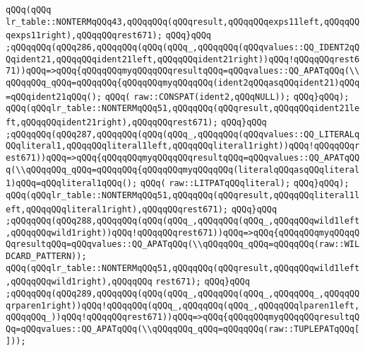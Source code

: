 \verb|qQQq(qQQq|\newline
\verb|lr_table::NONTERMqQQq43,qQQqqQQq(qQQqresult,qQQqqQQqexps11left,qQQqqQQqexps11right),qQQqqQQqrest671);|\newline
\verb|qQQq}qQQq|\newline
\verb|;qQQqqQQq(qQQq286,qQQqqQQq(qQQq(qQQq_,qQQqqQQq(qQQqvalues::QQ_IDENT2qQQqident21,qQQqqQQqident21left,qQQqqQQqident21right))qQQq!qQQqqQQqrest671))qQQq=>qQQq{qQQqqQQqmyqQQqqQQqresultqQQq=qQQqvalues::QQ_APATqQQq(\\qQQqqQQq_qQQq=qQQqqQQq{qQQqqQQqmyqQQqqQQq(ident2qQQqasqQQqident21)qQQq=qQQqident21qQQq();|\newline
\verb|qQQq(|\newline
\verb|raw::CONSPAT(ident2,qQQqNULL));|\newline
\verb|qQQq}qQQq);|\newline
\verb|qQQq(qQQqlr_table::NONTERMqQQq51,qQQqqQQq(qQQqresult,qQQqqQQqident21left,qQQqqQQqident21right),qQQqqQQqrest671);|\newline
\verb|qQQq}qQQq|\newline
\verb|;qQQqqQQq(qQQq287,qQQqqQQq(qQQq(qQQq_,qQQqqQQq(qQQqvalues::QQ_LITERALqQQqliteral1,qQQqqQQqliteral1left,qQQqqQQqliteral1right))qQQq!qQQqqQQqrest671))qQQq=>qQQq{qQQqqQQqmyqQQqqQQqresultqQQq=qQQqvalues::QQ_APATqQQq(\\qQQqqQQq_qQQq=qQQqqQQq{qQQqqQQqmyqQQqqQQq(literalqQQqasqQQqliteral1)qQQq=qQQqliteral1qQQq();|\newline
\verb|qQQq(|\newline
\verb|raw::LITPATqQQqliteral);|\newline
\verb|qQQq}qQQq);|\newline
\verb|qQQq(qQQqlr_table::NONTERMqQQq51,qQQqqQQq(qQQqresult,qQQqqQQqliteral1left,qQQqqQQqliteral1right),qQQqqQQqrest671);|\newline
\verb|qQQq}qQQq|\newline
\verb|;qQQqqQQq(qQQq288,qQQqqQQq(qQQq(qQQq_,qQQqqQQq(qQQq_,qQQqqQQqwild1left,qQQqqQQqwild1right))qQQq!qQQqqQQqrest671))qQQq=>qQQq{qQQqqQQqmyqQQqqQQqresultqQQq=qQQqvalues::QQ_APATqQQq(\\qQQqqQQq_qQQq=qQQqqQQq(raw::WILDCARD_PATTERN));|\newline
\verb|qQQq(qQQqlr_table::NONTERMqQQq51,qQQqqQQq(qQQqresult,qQQqqQQqwild1left,qQQqqQQqwild1right),qQQqqQQq|\newline
\verb|rest671);|\newline
\verb|qQQq}qQQq|\newline
\verb|;qQQqqQQq(qQQq289,qQQqqQQq(qQQq(qQQq_,qQQqqQQq(qQQq_,qQQqqQQq_,qQQqqQQqrparen1right))qQQq!qQQqqQQq(qQQq_,qQQqqQQq(qQQq_,qQQqqQQqlparen1left,qQQqqQQq_))qQQq!qQQqqQQqrest671))qQQq=>qQQq{qQQqqQQqmyqQQqqQQqresultqQQq=qQQqvalues::QQ_APATqQQq(\\qQQqqQQq_qQQq=qQQqqQQq(raw::TUPLEPATqQQq[]));|\newline
